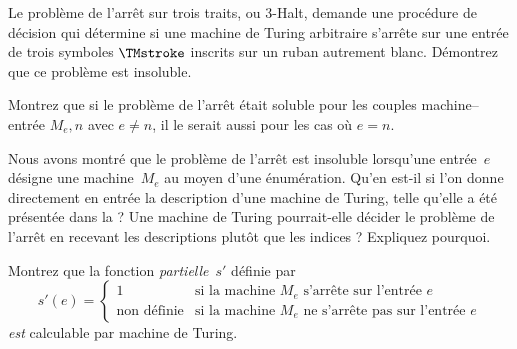 \documentclass[../../../include/open-logic-section]{subfiles}
\begin{document}
\begin{prob}
Le problème de l'arrêt sur trois traits, ou 3-Halt,
demande une procédure de décision qui détermine si une machine
de Turing arbitraire s'arrête sur une entrée de trois symboles
$\TMstroke$ inscrits sur un ruban autrement blanc. Démontrez
que ce problème est insoluble.
\end{prob}

\begin{prob}
Montrez que si le problème de l'arrêt était soluble pour les
couples machine--entrée $M_e,n$ avec $e\neq n$, il le serait
aussi pour les cas où $e=n$.
\end{prob}

\begin{prob}
Nous avons montré que le problème de l'arrêt est insoluble
lorsqu'une entrée~$e$ désigne une machine~$M_e$ au moyen d'une
énumération. Qu'en est-il si l'on donne directement en entrée
la description d'une machine de Turing, telle qu'elle a été
présentée dans la  ? Une machine de Turing
pourrait-elle décider le problème de l'arrêt en recevant les
descriptions plutôt que les indices ? Expliquez pourquoi.
\end{prob}

\begin{prob}
Montrez que la fonction \emph{partielle}~$s'$ définie par
\[
s'(e) =
\begin{cases}
  \text{1} & \text{si la machine~$M_e$ s'arrête sur l'entrée~$e$}\\
  \text{non définie} & \text{si la machine~$M_e$ ne s'arrête pas sur l'entrée~$e$}
\end{cases}
\]
\emph{est} calculable par machine de Turing.
\end{prob}
\end{document}
